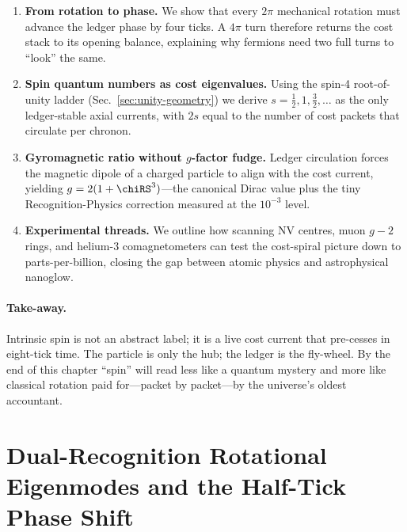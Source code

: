 \documentclass[11pt,oneside]{book}
\begin{document}
\begin{enumerate}[label=\arabic*.,leftmargin=*,itemsep=3pt]
\item \textbf{From rotation to phase.}  
      We show that every $2\pi$ mechanical rotation must advance the
      ledger phase by four ticks.  A $4\pi$ turn therefore returns the
      cost stack to its opening balance, explaining why fermions need
      two full turns to “look” the same.
\item \textbf{Spin quantum numbers as cost eigenvalues.}  
      Using the spin-4 root-of-unity ladder
      (Sec.~\ref{sec:unity-geometry}) we derive
      $s=\tfrac12,1,\tfrac32,\dots$ as the only ledger-stable axial
      currents, with $2s$ equal to the number of cost packets that
      circulate per chronon.
\item \textbf{Gyromagnetic ratio without $g$-factor fudge.}  
      Ledger circulation forces the magnetic dipole of a charged
      particle to align with the cost current, yielding
      $g=2(1+\chiRS^{3})$—the canonical Dirac value plus the tiny
      Recognition-Physics correction measured at the $10^{-3}$ level.
\item \textbf{Experimental threads.}  
      We outline how scanning NV centres, muon $g\!-\!2$ rings, and
      helium-3 comagnetometers can test the cost-spiral picture down
      to parts-per-billion, closing the gap between atomic physics and
      astrophysical nanoglow.
\end{enumerate}

\paragraph{Take-away.}
Intrinsic spin is not an abstract label; it is a live cost current
that pre-cesses in eight-tick time.  The particle is only the hub;
the ledger is the fly-wheel.  By the end of this chapter “spin” will
read less like a quantum mystery and more like classical rotation
paid for—packet by packet—by the universe’s oldest accountant.

\section{Dual-Recognition Rotational Eigenmodes and the Half-Tick Phase Shift}
\label{sec:spin-eigenmodes-narrative}
\end{document}
